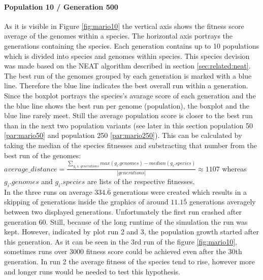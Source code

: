 		\paragraph{Population 10 / Generation 500}
			\label{par:mario10}
			As it is visible in Figure \ref{fig:mario10} the vertical axis shows the fitness score average of the genomes within a species. The horizontal axis portrays the generations containing the species. Each generation contains up to 10 populations which is divided into species and genomes within species. This species devision was made based on the NEAT algorithm described in section \ref{sec:related:neat}. The best run of the genomes grouped by each generation is marked with a blue line. Therefore the blue line indicates the best overall run within a generation. Since the boxplot portrays the species's avarage score of each generation and the the blue line shows the best run per genome (population), the boxplot and the blue line rarely meet. Still the average population score is closer to the best run than in the next two population variants (see later in this section population 50 \ref{par:mario50} and population 250 \ref{par:mario250}). This can be calculated by taking the median of the species fitnesses and substracting that number from the best run of the genomes:
			$average\_distance = \frac{\sum\nolimits_{g_i \in generations} max(g_i.genomes) - median(g_i.species)}{|generations|}\approx1107$ whereas $g_i.genomes$ and $g_i.species$ are lists of the respective fitnesses. \\
			In the three runs on average $334.\overline{6}$ generations were created which results in a skipping of generations inside the graphics of around $11.1\overline{5}$ generations averagely between two displayed generations. Unfortunately the first run crashed after generation 60. Still, because of the long runtime of the simulation the run was kept. However, indicated by plot run 2 and 3, the population growth started after this generation. As it can be seen in the 3rd run of the figure \ref{fig:mario10}, sometimes runs over 3000 fitness score could be achieved even after the 30th generation. In run 2 the average fitness of the species tend to rise, however more and longer runs would be needed to test this hypothesis.\\
